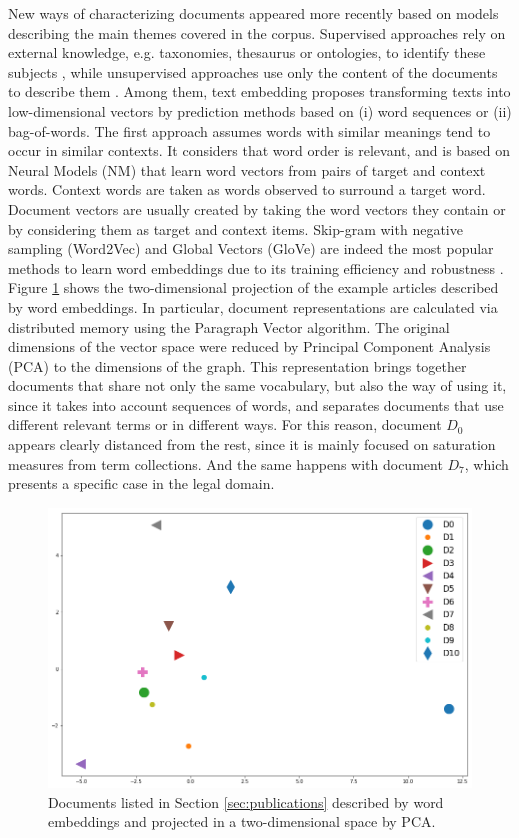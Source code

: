 New ways of characterizing documents appeared more recently based on models describing the main themes covered in the corpus. Supervised approaches rely on external knowledge, e.g. taxonomies, thesaurus or ontologies, to identify these subjects \citep{Salatino2019, GarciaSilva2021, Kandimalla2021}, while unsupervised approaches use only the content of the documents to describe them \citep{Wei2019, Litschko2021}. Among them, text embedding proposes transforming texts into low-dimensional vectors by prediction methods based on (i) word sequences or (ii) bag-of-words. The first approach assumes words with similar meanings tend to occur in similar contexts. It considers that word order is relevant, and is based on Neural Models (NM) that learn word vectors from pairs of target and context words. Context words are taken as words observed to surround a target word. Document vectors are usually created by taking the word vectors they contain or by considering them as target and context items. Skip-gram with negative sampling (Word2Vec) \citep{Mikolov2013c} and Global Vectors (GloVe) \citep{pennington2014} are indeed the most popular methods to learn word embeddings due to its training efficiency and robustness \citep{levy2015}. Figure \ref{fig:doc2vec} shows the two-dimensional projection of the example articles described by word embeddings. In particular, document representations are calculated via distributed memory using the Paragraph Vector \citep{LeMikolov2014} algorithm. The original dimensions of the vector space were reduced by Principal Component Analysis (PCA) to the dimensions of the graph. This representation brings together documents that share not only the same vocabulary, but also the way of using it, since it takes into account sequences of words, and separates documents that use different relevant terms or in different ways. For this reason, document $D_0$ appears clearly distanced from the rest, since it is mainly focused on saturation measures from term collections. And the same happens with document $D_7$, which presents a specific case in the legal domain.



\begin{figure}[!htbp]
\centering
\includegraphics[scale=0.34]{doc2vec.png}
\caption{Documents listed in Section \ref{sec:publications} described by word embeddings and projected in a two-dimensional space by PCA. }
\label{fig:doc2vec}
\end{figure}


